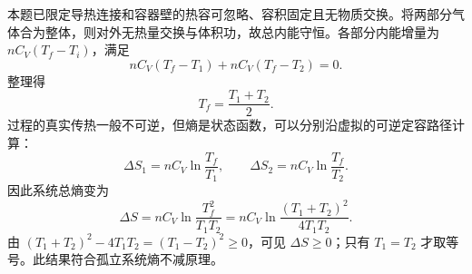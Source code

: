本题已限定导热连接和容器壁的热容可忽略、容积固定且无物质交换。将两部分气体合为整体，则对外无热量交换与体积功，故总内能守恒。各部分内能增量为 $nC_V(T_f-T_i)$，满足
\[
nC_V(T_f-T_1)+nC_V(T_f-T_2)=0.
\]
整理得
\[
\boxed{T_f=\frac{T_1+T_2}{2}}.
\]
过程的真实传热一般不可逆，但熵是状态函数，可以分别沿虚拟的可逆定容路径计算：
\[
\Delta S_1=nC_V\ln\frac{T_f}{T_1},\qquad
\Delta S_2=nC_V\ln\frac{T_f}{T_2}.
\]
因此系统总熵变为
\[
\boxed{\Delta S=nC_V\ln\frac{T_f^2}{T_1T_2}
=nC_V\ln\frac{(T_1+T_2)^2}{4T_1T_2}}.
\]
由 $(T_1+T_2)^2-4T_1T_2=(T_1-T_2)^2\geq0$，可见 $\Delta S\geq0$；只有 $T_1=T_2$ 才取等号。此结果符合孤立系统熵不减原理。
